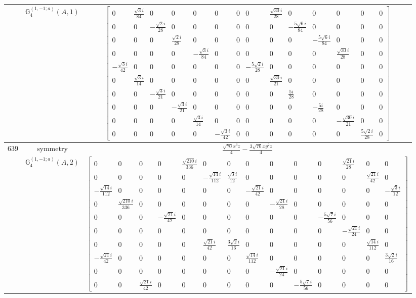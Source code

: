 \documentclass[fleqn,8pt,landscape]{jsarticle}
\begin{document}
\begin{longtable}{ccc}
$  $ & $ \mathbb{G}_{4}^{(1,-1;a)}(A,1) $ & $ \begin{bmatrix} 0 & \frac{\sqrt{3} i}{84} & 0 & 0 & 0 & 0 & 0 & 0 & \frac{\sqrt{30} i}{28} & 0 & 0 & 0 & 0 & 0 \\ 0 & 0 & - \frac{\sqrt{2} i}{28} & 0 & 0 & 0 & 0 & 0 & 0 & - \frac{5 \sqrt{6} i}{84} & 0 & 0 & 0 & 0 \\ 0 & 0 & 0 & \frac{\sqrt{2} i}{28} & 0 & 0 & 0 & 0 & 0 & 0 & - \frac{5 \sqrt{6} i}{84} & 0 & 0 & 0 \\ 0 & 0 & 0 & 0 & - \frac{\sqrt{3} i}{84} & 0 & 0 & 0 & 0 & 0 & 0 & \frac{\sqrt{30} i}{28} & 0 & 0 \\ - \frac{\sqrt{3} i}{42} & 0 & 0 & 0 & 0 & 0 & 0 & - \frac{5 \sqrt{2} i}{28} & 0 & 0 & 0 & 0 & 0 & 0 \\ 0 & \frac{\sqrt{3} i}{14} & 0 & 0 & 0 & 0 & 0 & 0 & \frac{\sqrt{30} i}{21} & 0 & 0 & 0 & 0 & 0 \\ 0 & 0 & - \frac{\sqrt{3} i}{21} & 0 & 0 & 0 & 0 & 0 & 0 & \frac{5 i}{28} & 0 & 0 & 0 & 0 \\ 0 & 0 & 0 & - \frac{\sqrt{3} i}{21} & 0 & 0 & 0 & 0 & 0 & 0 & - \frac{5 i}{28} & 0 & 0 & 0 \\ 0 & 0 & 0 & 0 & \frac{\sqrt{3} i}{14} & 0 & 0 & 0 & 0 & 0 & 0 & - \frac{\sqrt{30} i}{21} & 0 & 0 \\ 0 & 0 & 0 & 0 & 0 & - \frac{\sqrt{3} i}{42} & 0 & 0 & 0 & 0 & 0 & 0 & \frac{5 \sqrt{2} i}{28} & 0 \end{bmatrix} $ \\ \hline
$ 639 $ & $ \text{symmetry} $ & $ \frac{\sqrt{70} x^{3} z}{4} - \frac{3 \sqrt{70} x y^{2} z}{4} $ \\
$  $ & $ \mathbb{G}_{4}^{(1,-1;a)}(A,2) $ & $ \begin{bmatrix} 0 & 0 & 0 & 0 & \frac{\sqrt{210} i}{336} & 0 & 0 & 0 & 0 & 0 & 0 & \frac{\sqrt{21} i}{28} & 0 & 0 \\ 0 & 0 & 0 & 0 & 0 & - \frac{\sqrt{14} i}{112} & \frac{\sqrt{3} i}{12} & 0 & 0 & 0 & 0 & 0 & \frac{\sqrt{21} i}{42} & 0 \\ - \frac{\sqrt{14} i}{112} & 0 & 0 & 0 & 0 & 0 & 0 & - \frac{\sqrt{21} i}{42} & 0 & 0 & 0 & 0 & 0 & - \frac{\sqrt{3} i}{12} \\ 0 & \frac{\sqrt{210} i}{336} & 0 & 0 & 0 & 0 & 0 & 0 & - \frac{\sqrt{21} i}{28} & 0 & 0 & 0 & 0 & 0 \\ 0 & 0 & 0 & - \frac{\sqrt{21} i}{42} & 0 & 0 & 0 & 0 & 0 & 0 & - \frac{5 \sqrt{7} i}{56} & 0 & 0 & 0 \\ 0 & 0 & 0 & 0 & 0 & 0 & 0 & 0 & 0 & 0 & 0 & - \frac{\sqrt{21} i}{24} & 0 & 0 \\ 0 & 0 & 0 & 0 & 0 & \frac{\sqrt{21} i}{42} & \frac{3 \sqrt{2} i}{16} & 0 & 0 & 0 & 0 & 0 & \frac{\sqrt{14} i}{112} & 0 \\ - \frac{\sqrt{21} i}{42} & 0 & 0 & 0 & 0 & 0 & 0 & \frac{\sqrt{14} i}{112} & 0 & 0 & 0 & 0 & 0 & \frac{3 \sqrt{2} i}{16} \\ 0 & 0 & 0 & 0 & 0 & 0 & 0 & 0 & - \frac{\sqrt{21} i}{24} & 0 & 0 & 0 & 0 & 0 \\ 0 & 0 & \frac{\sqrt{21} i}{42} & 0 & 0 & 0 & 0 & 0 & 0 & - \frac{5 \sqrt{7} i}{56} & 0 & 0 & 0 & 0 \end{bmatrix} $ \\ \hline

\end{longtable}
\end{document}
